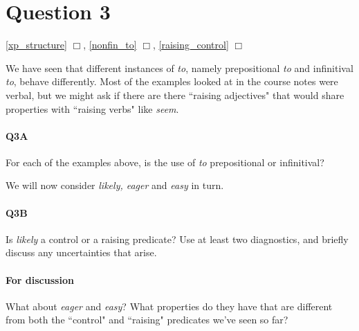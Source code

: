 \documentclass{article}
\begin{document}
\section*{Question 3}%
\hfill{} 
\ref{xp_structure} $\Box$,
\ref{nonfin_to} $\Box$,
\ref{raising_control} $\Box$%

We have seen that different instances of \emph{to}, namely prepositional \emph{to} and infinitival \emph{to}, behave differently.
Most of the examples looked at in the course notes were verbal, but we might ask if there are there ``raising adjectives" that would share properties with ``raising verbs" like \emph{seem}. 
\begin{exe}
\end{exe}

\paragraph{Q3A} For each of the examples above, is the use of \emph{to} prepositional or infinitival?

We will now consider \emph{likely, eager} and \emph{easy} in turn.

\paragraph{Q3B} Is \emph{likely} a control or a raising predicate? Use at least two diagnostics, and briefly discuss any uncertainties that arise.

\paragraph{For discussion} What about \emph{eager} and \emph{easy}? What properties do they have that are different from both the ``control" and ``raising" predicates we've seen so far?
\end{document}
